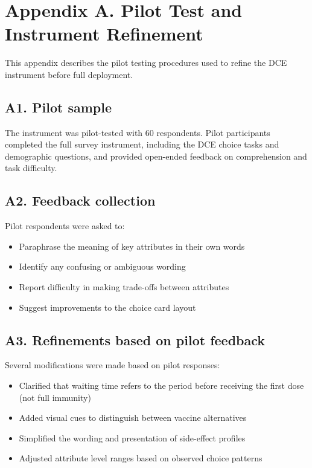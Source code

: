 \section*{Appendix A. Pilot Test and Instrument Refinement}
\label{app:A}

This appendix describes the pilot testing procedures used to refine the DCE instrument before full deployment.

\subsection*{A1. Pilot sample}

The instrument was pilot-tested with 60 respondents. Pilot participants completed the full survey instrument, including the DCE choice tasks and demographic questions, and provided open-ended feedback on comprehension and task difficulty.

\subsection*{A2. Feedback collection}

Pilot respondents were asked to:
\begin{itemize}
    \item Paraphrase the meaning of key attributes in their own words
    \item Identify any confusing or ambiguous wording
    \item Report difficulty in making trade-offs between attributes
    \item Suggest improvements to the choice card layout
\end{itemize}

\subsection*{A3. Refinements based on pilot feedback}

Several modifications were made based on pilot responses:
\begin{itemize}
    \item Clarified that waiting time refers to the period before receiving the first dose (not full immunity)
    \item Added visual cues to distinguish between vaccine alternatives
    \item Simplified the wording and presentation of side-effect profiles
    \item Adjusted attribute level ranges based on observed choice patterns
\end{itemize}

\clearpage
